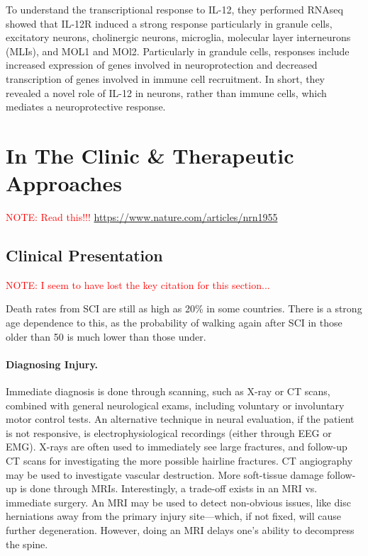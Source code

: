To understand the transcriptional response to IL-12, they performed RNAseq showed that IL-12R induced a strong response particularly in granule cells, excitatory neurons, cholinergic neurons, microglia, molecular layer interneurons (MLIs), and MOL1 and MOl2. Particularly in grandule cells, responses include increased expression of genes involved in neuroprotection and decreased transcription of genes involved in immune cell recruitment. In short, they revealed a novel role of IL-12 in neurons, rather than immune cells, which mediates a neuroprotective response. 


\chapter{In The Clinic \& Therapeutic Approaches}

\textcolor{red}{NOTE: Read this!!! \url{https://www.nature.com/articles/nrn1955}}


\section{Clinical Presentation}

\textcolor{red}{NOTE: I seem to have lost the key citation for this section...}\newline

Death rates from SCI are still as high as 20\% in some countries. There is a strong age dependence to this, as the probability of walking again after SCI in those older than 50 is much lower than those under.

\subsubsection{Diagnosing Injury.}
Immediate diagnosis is done through scanning, such as X-ray or CT scans, combined with general neurological exams, including voluntary or involuntary motor control tests. An alternative technique in neural evaluation, if the patient is not responsive, is electrophysiological recordings (either through EEG or EMG). X-rays are often used to immediately see large fractures, and follow-up CT scans for investigating the more possible hairline fractures. CT angiography may be used to investigate vascular destruction. More soft-tissue damage follow-up is done through MRIs. Interestingly, a trade-off exists in an MRI vs. immediate surgery. An MRI may be used to detect non-obvious issues, like disc herniations away from the primary injury site---which, if not fixed, will cause further degeneration. However, doing an MRI delays one's ability to decompress the spine.\newline


